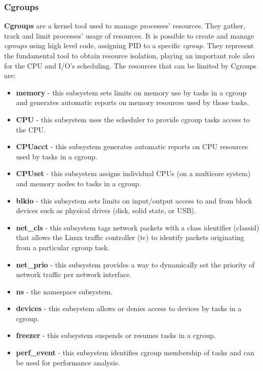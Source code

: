 \documentclass[a4paper,12pt]{article}
\begin{document}
\subsubsection{Cgroups}

\textbf{Cgroups} are a kernel tool used to manage processes' resources. They
gather, track and limit processes' usage of resources. It is possible to create
and manage \textit{cgroups} using high level code, assigning PID to a specific
\textit{cgroup}. They represent the fundamental tool to obtain resource
isolation, playing an important role also for the CPU and I/O's scheduling. The
resources that can be limited by Cgroups
are\cite{red_hat_introduction_to_cgroups}:
\begin{itemize}
  \item \textbf{memory} - this subsystem sets limits on memory use by tasks in a
  cgroup and generates automatic reports on memory resources used by those
  tasks. 
  \item \textbf{CPU} - this subsystem uses the scheduler to provide cgroup tasks
  access to the CPU. 
  \item \textbf{CPUacct} - this subsystem generates automatic reports on CPU
  resources used by tasks in a cgroup. 
  \item \textbf{CPUset} - this subsystem assigns individual CPUs (on a multicore
  system) and memory nodes to tasks in a cgroup.
  \item \textbf{blkio} - this subsystem sets limits on input/output access to
  and from block devices such as physical drives (disk, solid state, or USB). 
  \item \textbf{net\_cls} - this subsystem tags network packets with a class
  identifier (classid) that allows the Linux traffic controller (tc) to identify
  packets originating from a particular cgroup task. 
  \item \textbf{net\_prio} - this subsystem provides a way to dynamically set
  the priority of network traffic per network interface. 
  \item \textbf{ns} - the namespace subsystem. 
  \item \textbf{devices} - this subsystem allows or denies access to devices by
  tasks in a cgroup. 
  \item \textbf{freezer} - this subsystem suspends or resumes tasks in a cgroup.
  \item \textbf{perf\_event} - this subsystem identifies cgroup membership of
  tasks and can be used for performance analysis. 
\end{itemize}   
\end{document}
